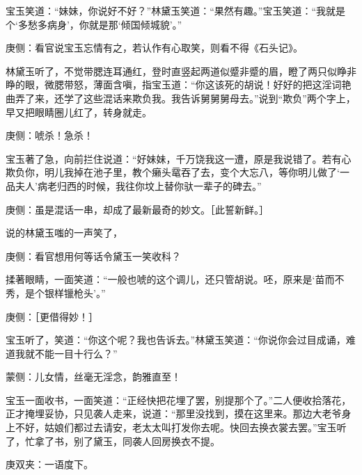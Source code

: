 \begin{parag}
    宝玉笑道：“妹妹，你说好不好？”林黛玉笑道：“果然有趣。”宝玉笑道：“我就是个‘多愁多病身’，你就是那‘倾国倾城貌’。”\begin{note}庚侧：看官说宝玉忘情有之，若认作有心取笑，则看不得《石头记》。\end{note}林黛玉听了，不觉带腮连耳通红，登时直竖起两道似蹙非蹙的眉，瞪了两只似睁非睁的眼，微腮带怒，薄面含嗔，指宝玉道：“你这该死的胡说！好好的把这淫词艳曲弄了来，还学了这些混话来欺负我。我告诉舅舅舅母去。”说到“欺负”两个字上，早又把眼睛圈儿红了，转身就走。\begin{note}庚侧：唬杀！急杀！\end{note}宝玉著了急，向前拦住说道：“好妹妹，千万饶我这一遭，原是我说错了。若有心欺负你，明儿我掉在池子里，教个癞头鼋吞了去，变个大忘八，等你明儿做了‘一品夫人’病老归西的时候，我往你坟上替你驮一辈子的碑去。”\begin{note}庚侧：虽是混话一串，却成了最新最奇的妙文。［此誓新鲜。］\end{note}说的林黛玉嗤的一声笑了，\begin{note}庚侧：看官想用何等话令黛玉一笑收科？\end{note}揉著眼睛，一面笑道：“一般也唬的这个调儿，还只管胡说。呸，原来是‘苗而不秀，是个银样镴枪头’。”\begin{note}庚侧：［更借得妙！］\end{note}宝玉听了，笑道：“你这个呢？我也告诉去。”林黛玉笑道：“你说你会过目成诵，难道我就不能一目十行么？”\begin{note}蒙侧：儿女情，丝毫无淫念，韵雅直至！\end{note}
\end{parag}


\begin{parag}
    宝玉一面收书，一面笑道：“正经快把花埋了罢，别提那个了。”二人便收拾落花，正才掩埋妥协，只见袭人走来，说道：“那里没找到，摸在这里来。那边大老爷身上不好，姑娘们都过去请安，老太太叫打发你去呢。快回去换衣裳去罢。”宝玉听了，忙拿了书，别了黛玉，同袭人回房换衣不提。\begin{note}庚双夹：一语度下。\end{note}
\end{parag}


